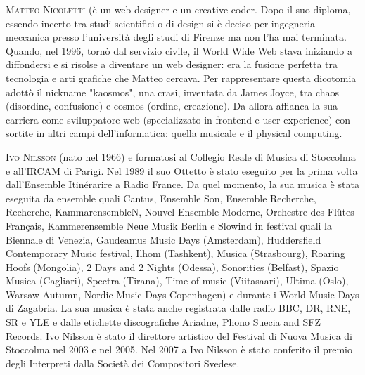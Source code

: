 \documentclass[9pt, twoside, a5paper]{extreport}
\newcommand{\biografia}[2]{%
\noindent \textsc{#1} %
#2 %
\medskip
}%
\begin{document}
\begin{multicols}{2}

\biografia{Matteo Nicoletti}{(è un web designer e un creative coder. Dopo il suo diploma, essendo incerto tra studi scientifici o di design si è deciso per ingegneria meccanica presso l’università degli studi di Firenze ma non l’ha mai terminata. Quando, nel 1996, tornò dal servizio civile, il World Wide Web stava iniziando a diffondersi e si risolse a diventare un web designer: era la fusione perfetta tra tecnologia e arti grafiche che Matteo cercava. Per rappresentare questa dicotomia adottò il nickname "kaosmos", una crasi, inventata da James Joyce, tra chaos (disordine, confusione) e cosmos (ordine, creazione). Da allora affianca la sua carriera come sviluppatore web (specializzato in frontend e user experience) con sortite in altri campi dell’informatica: quella musicale e il physical computing.}

\biografia{Ivo Nilsson}{(nato nel 1966) e formatosi al Collegio Reale di Musica di Stoccolma e all'IRCAM di Parigi. Nel 1989 il suo Ottetto è stato eseguito per la prima volta dall'Ensemble Itinérarire a Radio France. Da quel momento, la sua musica è stata eseguita da ensemble quali Cantus, Ensemble Son, Ensemble Recherche, Recherche, KammarensembleN, Nouvel Ensemble Moderne, Orchestre des Flûtes Français, Kammerensemble Neue Musik Berlin e Slowind in festival quali la Biennale di Venezia, Gaudeamus Music Days (Amsterdam), Huddersfield Contemporary Music festival, Ilhom (Tashkent), Musica (Strasbourg), Roaring Hoofs (Mongolia), 2 Days and 2 Nights (Odessa), Sonorities (Belfast), Spazio Musica (Cagliari), Spectra (Tirana), Time of music (Viitasaari), Ultima (Oslo), Warsaw Autumn, Nordic Music Days Copenhagen) e durante i World Music Days di Zagabria. La sua musica è stata anche registrata dalle radio BBC, DR, RNE, SR e YLE e dalle etichette discografiche Ariadne, Phono Suecia and SFZ Records. Ivo Nilsson è stato il direttore artistico del Festival di Nuova Musica di Stoccolma nel 2003 e nel 2005. Nel 2007 a Ivo Nilsson è stato conferito il premio degli Interpreti dalla Società dei Compositori Svedese.}


\end{multicols}
\end{document}
